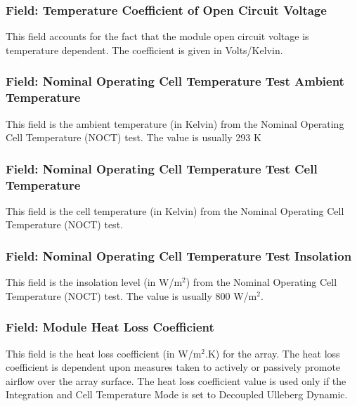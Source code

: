 \subsubsection{Field: Temperature Coefficient of Open Circuit Voltage}\label{field-temperature-coefficient-of-open-circuit-voltage}

This field accounts for the fact that the module open circuit voltage is temperature dependent. The coefficient is given in Volts/Kelvin.

\subsubsection{Field: Nominal Operating Cell Temperature Test Ambient Temperature}\label{field-nominal-operating-cell-temperature-test-ambient-temperature}

This field is the ambient temperature (in Kelvin) from the Nominal Operating Cell Temperature (NOCT) test. The value is usually 293 K

\subsubsection{Field: Nominal Operating Cell Temperature Test Cell Temperature}\label{field-nominal-operating-cell-temperature-test-cell-temperature}

This field is the cell temperature (in Kelvin) from the Nominal Operating Cell Temperature (NOCT) test.

\subsubsection{Field: Nominal Operating Cell Temperature Test Insolation}\label{field-nominal-operating-cell-temperature-test-insolation}

This field is the insolation level (in W/m\(^{2}\)) from the Nominal Operating Cell Temperature (NOCT) test. The value is usually 800 W/m\(^{2}\).

\subsubsection{Field: Module Heat Loss Coefficient}\label{field-module-heat-loss-coefficient}

This field is the heat loss coefficient (in W/m\(^{2}\).K) for the array. The heat loss coefficient is dependent upon measures taken to actively or passively promote airflow over the array surface. The heat loss coefficient value is used only if the Integration and Cell Temperature Mode is set to Decoupled Ulleberg Dynamic.

